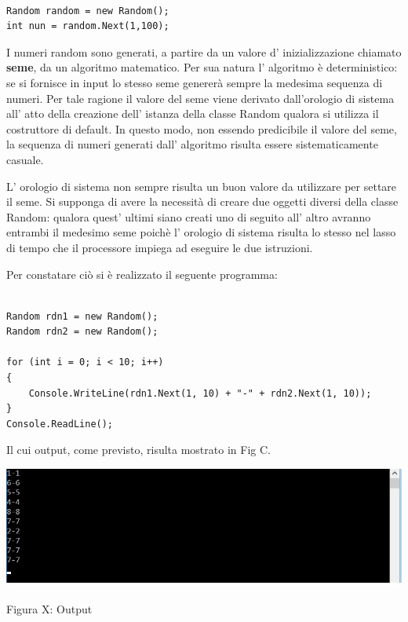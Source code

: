 \documentclass[11pt]{article}
\begin{document}
\begin{lstlisting}

Random random = new Random();
int nun = random.Next(1,100);

\end{lstlisting}

I numeri random sono generati, a partire da un valore d' inizializzazione chiamato \textbf{seme}, da un algoritmo matematico. Per sua natura l' algoritmo è deterministico: se si fornisce in input lo stesso seme genererà sempre la medesima sequenza di numeri. Per tale ragione il valore del seme viene derivato dall'orologio di sistema all' atto della  creazione dell' istanza della classe Random qualora si utilizza il costruttore di default. In questo modo, non essendo predicibile il valore del seme, la sequenza di numeri generati dall' algoritmo risulta essere sistematicamente casuale. 

L' orologio di sistema non sempre risulta un buon valore da utilizzare per settare il seme. Si supponga di avere la necessità di creare due oggetti diversi della classe Random: qualora quest' ultimi siano creati uno di seguito all' altro avranno entrambi il medesimo seme poichè l' orologio di sistema risulta lo stesso nel lasso di tempo che il processore impiega ad eseguire le due istruzioni.

Per constatare ciò si è realizzato il seguente programma:

\begin{lstlisting}

Random rdn1 = new Random();
Random rdn2 = new Random();

for (int i = 0; i < 10; i++)
{
    Console.WriteLine(rdn1.Next(1, 10) + "-" + rdn2.Next(1, 10));
}
Console.ReadLine();

\end{lstlisting}

Il cui output, come previsto, risulta mostrato in Fig C.

\begin{center}
\includegraphics[scale=0.5]{output}  

Figura X: Output 

\end{center}
\end{document}
